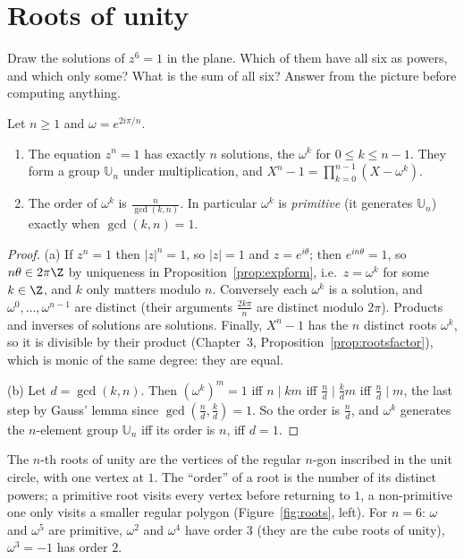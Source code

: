 \section{Roots of unity}

\begin{think}
Draw the solutions of $z^6=1$ in the plane. Which of them have all six as powers, and which only some? What is the sum of all six? Answer from the picture before computing anything.
\end{think}

\begin{proposition}\label{prop:roots}
Let $n\ge1$ and $\omega=e^{2i\pi/n}$.
\begin{enumerate}[label=(\alph*)]
\item The equation $z^n=1$ has exactly $n$ solutions, the $\omega^k$ for $0\le k\le n-1$. They form a group $\mathbb U_n$ under multiplication, and
$X^n-1=\prod_{k=0}^{n-1}\left(X-\omega^k\right)$.
\item The order of $\omega^k$ is $\frac n{\gcd(k,n)}$. In particular $\omega^k$ is \emph{primitive} (it generates $\mathbb U_n$) exactly when $\gcd(k,n)=1$.
\end{enumerate}
\end{proposition}
\begin{proof}
(a) If $z^n=1$ then $|z|^n=1$, so $|z|=1$ and $z=e^{i\theta}$; then $e^{in\theta}=1$, so $n\theta\in2\pi\Z$ by uniqueness in Proposition~\ref{prop:expform}, i.e.\ $z=\omega^k$ for some $k\in\Z$, and $k$ only matters modulo $n$. Conversely each $\omega^k$ is a solution, and $\omega^0,\dots,\omega^{n-1}$ are distinct (their arguments $\frac{2k\pi}n$ are distinct modulo $2\pi$). Products and inverses of solutions are solutions. Finally, $X^n-1$ has the $n$ distinct roots $\omega^k$, so it is divisible by their product (Chapter~3, Proposition~\ref{prop:rootsfactor}), which is monic of the same degree: they are equal.

(b) Let $d=\gcd(k,n)$. Then $(\omega^k)^m=1$ iff $n\mid km$ iff $\frac nd\mid\frac kd m$ iff $\frac nd\mid m$, the last step by Gauss' lemma since $\gcd\!\left(\frac nd,\frac kd\right)=1$. So the order is $\frac nd$, and $\omega^k$ generates the $n$-element group $\mathbb U_n$ iff its order is $n$, iff $d=1$.
\end{proof}

The $n$-th roots of unity are the vertices of the regular $n$-gon inscribed in the unit circle, with one vertex at $1$. The ``order'' of a root is the
number of its distinct powers; a primitive root visits every vertex before returning to $1$, a non-primitive one only visits a smaller regular polygon
(Figure~\ref{fig:roots}, left). For $n=6$: $\omega$ and $\omega^5$ are primitive, $\omega^2$ and $\omega^4$ have order $3$ (they are the cube roots of unity),
$\omega^3=-1$ has order $2$.

